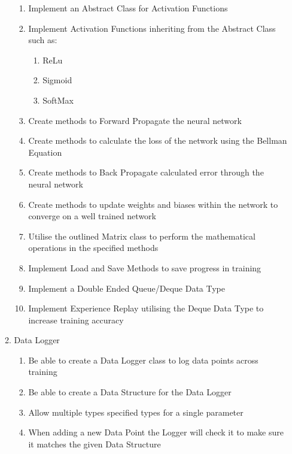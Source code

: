 \begin{flushleft}
\begin{enumerate}
\begin{enumerate}
\begin{enumerate}
                        \item Implement an Abstract Class for Activation Functions
                        \item Implement Activation Functions inheriting from the Abstract Class such as:
                        \begin{enumerate}
                            \item ReLu
                            \item Sigmoid
                            \item SoftMax
                        \end{enumerate}
                        \item Create methods to Forward Propagate the neural network
                        \item Create methods to calculate the loss of the network using the Bellman Equation
                        \item Create methods to Back Propagate calculated error through the neural network
                        \item Create methods to update weights and biases within the network to converge on a well trained network
                        \item Utilise the outlined Matrix class to perform the mathematical operations in the specified methods
                        \item Implement Load and Save Methods to save progress in training
                        \item Implement a Double Ended Queue/Deque Data Type
                        \item Implement Experience Replay utilising the Deque Data Type to increase training accuracy
                    \end{enumerate}   
                \item Data Logger
                    \begin{enumerate}
                        \item Be able to create a Data Logger class to log data points across training
                        \item Be able to create a Data Structure for the Data Logger
                        \item Allow multiple types specified types for a single parameter
                        \item When adding a new Data Point the Logger will check it to make sure it matches the given Data Structure

\end{enumerate}
\end{enumerate}
\end{enumerate}
\end{flushleft}
